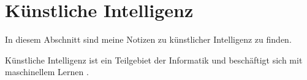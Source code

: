 \section{Künstliche Intelligenz}
\label{sec:ai}

In diesem Abschnitt sind meine Notizen zu künstlicher Intelligenz zu finden.

Künstliche Intelligenz ist ein Teilgebiet der Informatik und beschäftigt sich mit maschinellem Lernen \citep{ai-wikipedia}.